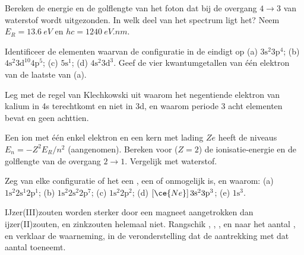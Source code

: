 \begin{exercise}[$\star\star$]\label{exo:b1:quantum-numbers:7}
Bereken de energie en de golflengte van het foton dat bij de overgang
$4 \to 3$ van waterstof wordt uitgezonden. In welk deel van het spectrum
ligt het? Neem $E_R = \qty{13.6}{eV}$ en $hc = \qty{1240}{eV.nm}$.
\end{exercise}

\begin{exercise}[$\star\star$]\label{exo:b1:quantum-numbers:8}
Identificeer de elementen waarvan de configuratie in de 
eindigt op (a) $3\text{s}^2 3\text{p}^4$; (b) $4\text{s}^2 3\text{d}^{10} 4\text{p}^5$;
(c) $5\text{s}^1$; (d) $4\text{s}^2 3\text{d}^3$. Geef de vier
kwantumgetallen van één elektron van de laatste  van (a).
\end{exercise}

\begin{exercise}[$\star\star$]\label{exo:b1:quantum-numbers:9}
Leg met de regel van Klechkowski uit waarom het negentiende elektron van
kalium in 4s terechtkomt en niet in 3d, en waarom periode 3 acht
elementen bevat en geen achttien.
\end{exercise}

\begin{exercise}[$\star\star\star$]\label{exo:b1:quantum-numbers:10}
Een ion met één enkel elektron en een kern met lading $Ze$ heeft de
niveaus $E_n = -Z^2 E_R/n^2$ (aangenomen). Bereken voor 
($Z = 2$) de ionisatie-energie en de golflengte van de overgang $2 \to 1$.
Vergelijk met waterstof.
\end{exercise}

\begin{exercise}[$\star\star\star$]\label{exo:b1:quantum-numbers:11}
Zeg van elke configuratie of het een , een  of onmogelijk is, en waarom: (a) $1\text{s}^2 2\text{s}^1 2\text{p}^1$;
(b) $1\text{s}^2 2\text{s}^2 2\text{p}^7$; (c) $1\text{s}^2 2\text{p}^2$;
(d) $[\ce{Ne}]\,3\text{s}^2 3\text{p}^3$; (e) $1\text{s}^3$.
\end{exercise}

\begin{exercise}[$\star\star\star$]\label{exo:b1:quantum-numbers:12}
IJzer(III)zouten worden sterker door een magneet aangetrokken dan
ijzer(II)zouten, en zinkzouten helemaal niet. Rangschik ,
, ,  en  naar het aantal
, en verklaar de waarneming, in de veronderstelling
dat de aantrekking met dat aantal toeneemt.
\end{exercise}

